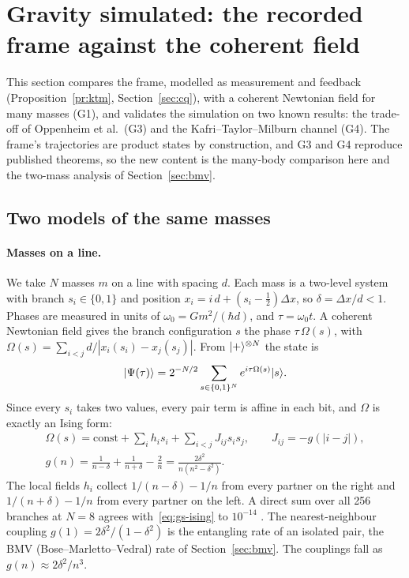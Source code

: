\section{Gravity simulated: the recorded frame against the coherent field}\label{sec:gravsim}

This section compares the frame, modelled as measurement and feedback (Proposition~\ref{pr:ktm}, Section~\ref{sec:cq}), with a coherent
Newtonian field for many masses (G1), and validates the simulation on two known results: the trade-off of Oppenheim et al.\ (G3) and the
Kafri--Taylor--Milburn channel (G4). The frame's trajectories are product states by construction, and G3 and G4 reproduce published theorems,
so the new content is the many-body comparison here and the two-mass analysis of Section~\ref{sec:bmv}.

\subsection{Two models of the same masses}\label{ss:gs-models}

\paragraph{Masses on a line.} We take $N$ masses $m$ on a line with spacing $d$. Each mass is a two-level system with branch
$s_i\in\{0,1\}$ and position $x_i=i\,d+(s_i-\tfrac12)\Delta x$, so $\delta=\Delta x/d<1$. Phases are measured in units of
$\omega_0=Gm^2/(\hbar d)$, and $\tau=\omega_0t$. A coherent Newtonian field gives the branch configuration $s$ the phase $\tau\,\Omega(s)$,
with $\Omega(s)=\sum_{i<j}d/|x_i(s_i)-x_j(s_j)|$. From $\lvert +\rangle^{\otimes N}$ the state is
\begin{equation}\label{eq:gs-psi}
\lvert \Psi(\tau)\rangle=2^{-N/2}\sum_{s\in\{0,1\}^N}e^{i\tau\Omega(s)}\lvert s\rangle.
\end{equation}
Since every $s_i$ takes two values, every pair term is affine in each bit, and $\Omega$ is exactly an Ising form:
\begin{gather}
\Omega(s)=\text{const}+\sum_ih_is_i+\sum_{i<j}J_{ij}s_is_j,\qquad J_{ij}=-g(|i-j|),\label{eq:gs-ising}\\
g(n)=\frac1{n-\delta}+\frac1{n+\delta}-\frac2n=\frac{2\delta^2}{n(n^2-\delta^2)}.\nonumber
\end{gather}
The local fields $h_i$ collect $1/(n-\delta)-1/n$ from every partner on the right and $1/(n+\delta)-1/n$ from every partner on the left. A
direct sum over all 256 branches at $N=8$ agrees with~\eqref{eq:gs-ising} to $10^{-14}$ . The nearest-neighbour coupling
$g(1)=2\delta^2/(1-\delta^2)$ is the entangling rate of an isolated pair, the BMV (Bose--Marletto--Vedral) rate of Section~\ref{sec:bmv}. The
couplings fall as $g(n)\approx2\delta^2/n^3$.

